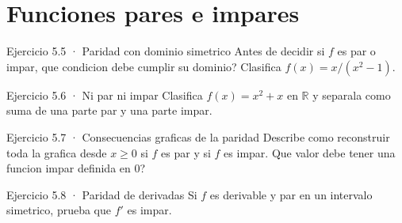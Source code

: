 \documentclass[10pt,a4paper,oneside,openany]{book}
\begin{document}
\section{Funciones pares e impares}
\begin{PSevenExerciseFixed}{Ejercicio 5.5 · Paridad con dominio simetrico}
Antes de decidir si \(f\) es par o impar, que condicion debe cumplir su dominio? Clasifica \(f(x)=x/(x^{2}-1)\).
\end{PSevenExerciseFixed}
\begin{PSevenExerciseFixed}{Ejercicio 5.6 · Ni par ni impar}
Clasifica \(f(x)=x^{2}+x\) en \(\mathbb{R}\) y separala como suma de una parte par y una parte impar.
\end{PSevenExerciseFixed}
\begin{PSevenExerciseFixed}{Ejercicio 5.7 · Consecuencias graficas de la paridad}
Describe como reconstruir toda la grafica desde \(x\ge 0\) si \(f\) es par y si \(f\) es impar. Que valor debe tener una funcion impar definida en \(0\)?
\end{PSevenExerciseFixed}
\begin{PSevenExerciseFixed}{Ejercicio 5.8 · Paridad de derivadas}
Si \(f\) es derivable y par en un intervalo simetrico, prueba que \(f'\) es impar.
\end{PSevenExerciseFixed}
\end{document}

